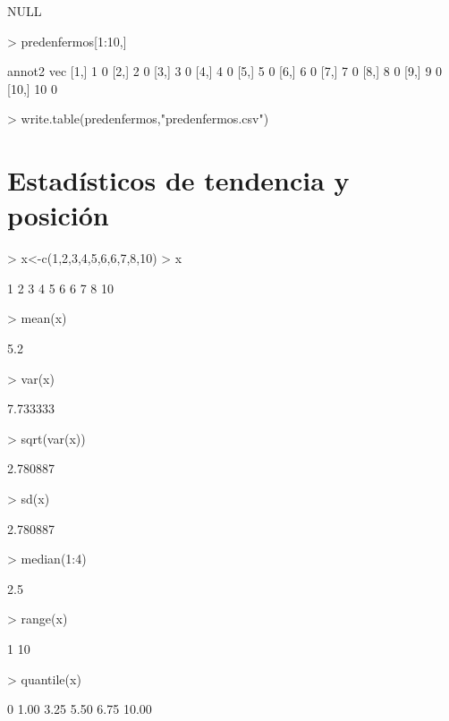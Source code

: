 \documentclass[12pt]{article}
\begin{document}
\begin{Schunk}
\begin{Soutput}
NULL
\end{Soutput}
\begin{Sinput}
> predenfermos[1:10,]
\end{Sinput}
\begin{Soutput}
      annot2 vec
 [1,]      1   0
 [2,]      2   0
 [3,]      3   0
 [4,]      4   0
 [5,]      5   0
 [6,]      6   0
 [7,]      7   0
 [8,]      8   0
 [9,]      9   0
[10,]     10   0
\end{Soutput}
\begin{Sinput}
> write.table(predenfermos,"predenfermos.csv")
\end{Sinput}
\end{Schunk}

  \section*{Estadísticos de tendencia y posición}
\begin{Schunk}
\begin{Sinput}
> x<-c(1,2,3,4,5,6,6,7,8,10)
> x
\end{Sinput}
\begin{Soutput}
 [1]  1  2  3  4  5  6  6  7  8 10
\end{Soutput}
\begin{Sinput}
> mean(x)
\end{Sinput}
\begin{Soutput}
[1] 5.2
\end{Soutput}
\begin{Sinput}
> var(x)
\end{Sinput}
\begin{Soutput}
[1] 7.733333
\end{Soutput}
\begin{Sinput}
> sqrt(var(x))
\end{Sinput}
\begin{Soutput}
[1] 2.780887
\end{Soutput}
\begin{Sinput}
> sd(x)
\end{Sinput}
\begin{Soutput}
[1] 2.780887
\end{Soutput}
\begin{Sinput}
> median(1:4)
\end{Sinput}
\begin{Soutput}
[1] 2.5
\end{Soutput}
\begin{Sinput}
> range(x)
\end{Sinput}
\begin{Soutput}
[1]  1 10
\end{Soutput}
\begin{Sinput}
> quantile(x)
\end{Sinput}
\begin{Soutput}
   0%
 1.00  3.25  5.50  6.75 10.00 
\end{Soutput}
\end{Schunk}
\end{document}
